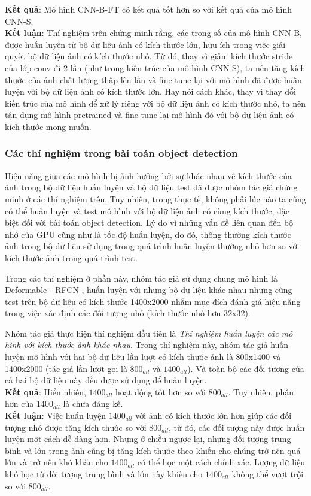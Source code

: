 {    \noindent
    \textbf{Kết quả}:
    Mô hình CNN-B-FT có kết quả tốt hơn so với kết quả của mô hình CNN-S. \\
    \textbf{Kết luận}:
    Thí nghiệm trên chứng minh rằng, các trọng số của mô hình CNN-B, được huấn luyện từ bộ dữ liệu ảnh có kích thước lớn, hữu ích trong việc giải quyết bộ dữ liệu ảnh có kích thước nhỏ.
    Từ đó, thay vì giảm kích thước stride của lớp conv đi 2 lần (như trong kiến trúc của mô hình CNN-S), ta nên tăng kích thước của ảnh chất lượng thấp lên lần và fine-tune lại với mô hình đã được huấn luyện với bộ dữ liệu ảnh có kích thước lớn.
    Hay nói cách khác, thay vì thay đổi kiến trúc của mô hình để xử lý riêng với bộ dữ liệu ảnh có kích thước nhỏ, ta nên tận dụng mô hình pretrained và fine-tune lại mô hình đó với bộ dữ liệu ảnh có kích thước mong muốn.

    \subsubsection{Các thí nghiệm trong bài toán object detection}
    Hiệu năng giữa các mô hình bị ảnh hưởng bởi sự khác nhau về kích thước của ảnh trong bộ dữ liệu huấn luyện và bộ dữ liệu test đã được nhóm tác giả chứng minh ở các thí nghiệm trên.
    Tuy nhiên, trong thực tế, không phải lúc nào ta cũng có thể huấn luyện và test mô hình với bộ dữ liệu ảnh có cùng kích thước, đặc biệt đối với bài toán object detection.
    Lý do vì những vấn đề liên quan đến bộ nhớ của GPU cũng như là tốc độ huấn luyện, do đó, thông thường kích thước ảnh trong bộ dữ liệu sử dụng trong quá trình huấn luyện thường nhỏ hơn so với kích thước ảnh trong quá trình test.

    \noindent
    Trong các thí nghiệm ở phần này, nhóm tác giả sử dụng chung mô hình là Deformable - RFCN \cite{dai2017deformable}, huấn luyện với những bộ dữ liệu khác nhau nhưng cùng test trên bộ dữ liệu có kích thước 1400x2000 nhằm mục đích đánh giá hiệu năng trong việc xác định các đối tượng nhỏ (kích thước nhỏ hơn 32x32).

    \noindent
    Nhóm tác giả thực hiện thí nghiệm đầu tiên là \textit{Thí nghiệm huấn luyện các mô hình với kích thước ảnh khác nhau}.
    Trong thí nghiệm này, nhóm tác giả huấn luyện mô hình với hai bộ dữ liệu lần lượt có kích thước ảnh là 800x1400 và 1400x2000 (tác giả lần lượt gọi là ${800}_{all}$ và ${1400}_{all}$).
    Và toàn bộ các đối tượng của cả hai bộ dữ liệu này đều được sử dụng để huấn luyện. \\
    \textbf{Kết quả}:
    Hiển nhiên, ${1400}_{all}$ hoạt động tốt hơn so với ${800}_{all}$.
    Tuy nhiên, phần hơn của ${1400}_{all}$ là chưa đáng kể. \\
    \textbf{Kết luận}:
    Việc huấn luyện ${1400}_{all}$ với ảnh có kích thước lớn hơn giúp các đối tượng nhỏ được tăng kích thước so với ${800}_{all}$, từ đó, các đối tượng này được huấn luyện một cách dễ dàng hơn.
    Nhưng ở chiều ngược lại, những đối tượng trung bình và lớn trong ảnh cũng bị tăng kích thước theo khiến cho chúng trở nên quá lớn và trở nên khó khăn cho ${1400}_{all}$ có thể học một cách chính xác.
    Lượng dữ liệu khó học từ đối tượng trung bình và lớn này khiến cho ${1400}_{all}$ không thể vượt trội so với ${800}_{all}$.

}
